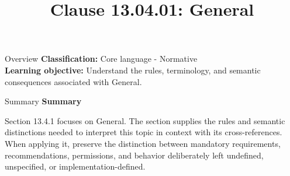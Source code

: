 \documentclass[10pt,letterpaper]{article}
\title{Clause 13.04.01: General}
\author{}
\date{}
\begin{document}
\maketitle
\begin{CornellOverviewBox}{Overview}
\textbf{Classification:} Core language - Normative\\[2pt]
\textbf{Learning objective:} Understand the rules, terminology, and semantic consequences associated with General.
\end{CornellOverviewBox}\begin{CornellSummaryBox}{Summary}
{\sffamily\bfseries\color{Accent} Summary}\par\vspace{3pt}Section 13.4.1 focuses on General. The section supplies the rules and semantic distinctions needed to interpret this topic in context with its cross-references. When applying it, preserve the distinction between mandatory requirements, recommendations, permissions, and behavior deliberately left undefined, unspecified, or implementation-defined.
\end{CornellSummaryBox}
\end{document}

